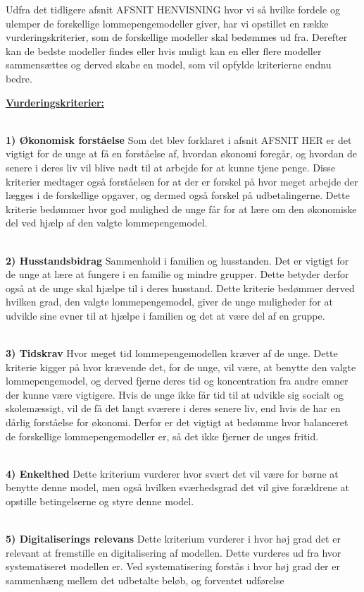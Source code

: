 ﻿Udfra det tidligere afsnit AFSNIT HENVISNING hvor vi så hvilke fordele og ulemper de forskellige lommepengemodeller giver, har vi opstillet en række vurderingskriterier, som de forskellige modeller skal bedømmes ud fra. Derefter kan de bedste modeller findes eller hvis muligt kan en eller flere modeller sammensættes og derved skabe en model, som vil opfylde kriterierne endnu bedre.

\uline{\textbf{Vurderingskriterier:}}

\\\textbf{1) Økonomisk forståelse}
Som det blev forklaret i afsnit AFSNIT HER er det vigtigt for de unge at få en forståelse af, hvordan økonomi foregår, og hvordan de senere i deres liv vil blive nødt til at arbejde for at kunne tjene penge. 
Disse kriterier medtager også forståelsen for at der er forskel på hvor meget arbejde der lægges i de forskellige opgaver, og dermed også forskel på udbetalingerne.
Dette kriterie bedømmer hvor god mulighed de unge får for at lære om den økonomiske del ved hjælp af den valgte lommepengemodel.

\\\textbf{2) Husstandsbidrag}
Sammenhold i familien og husstanden. 
Det er vigtigt for de unge at lære at fungere i en familie og mindre grupper. Dette betyder derfor også at de unge skal hjælpe til i deres husstand.
Dette kriterie bedømmer derved hvilken grad, den valgte lommepengemodel, giver de unge muligheder for at udvikle sine evner til at hjælpe i familien og det at være del af en gruppe.

\\\textbf{3) Tidskrav}
Hvor meget tid lommepengemodellen kræver af de unge.
Dette kriterie kigger på hvor krævende det, for de unge, vil være, at benytte den valgte lommepengemodel, og derved fjerne deres tid og koncentration fra andre emner der kunne være vigtigere. Hvis de unge ikke får tid til at udvikle sig socialt og skolemæssigt, vil de få det langt sværere i deres senere liv, end hvis de har en dårlig forståelse for økonomi.
Derfor er det vigtigt at bedømme hvor balanceret de forskellige lommepengemodeller er, så det ikke fjerner de unges fritid.

\\\textbf{4) Enkelthed}
Dette kriterium vurderer hvor svært det vil være for børne at benytte denne model, men også hvilken sværhedsgrad det vil give forældrene at opstille betingelserne og styre denne model.

\\\textbf{5) Digitaliserings relevans}
Dette kriterium vurderer i hvor høj grad det er relevant at fremstille en digitalisering af modellen. Dette vurderes ud fra hvor systematiseret modellen er. Ved systematisering forstås i hvor høj grad der er sammenhæng mellem det udbetalte beløb, og forventet udførelse%

